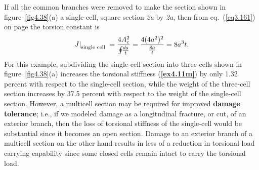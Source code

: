 \documentclass{AeroStructure-ERJohnson}
\begin{document}
\begin{example}
If all the common branches were removed to make the section shown in figure~\ref{fig4.38}(a) a single-cell, square section \textit{2a} by \textit{2a}, then from eq.~(\ref{eq3.161}) on page \pageref{eq3.161} the torsion constant is
\begin{align}\label{ex4.11q}
\left.J\right|_{\textrm{single cell }}=\frac{4 A_{c}^{2}}{\oint\hspace*{-3pt}\frac{d s}{t}}=\frac{4(4 a^{2})^{2}}{\frac{8 a}{t}}=8 a^{3} t.
\end{align}
For this example, subdividing the single-cell section into three cells shown in figure~\ref{fig4.38}(a) increases the torsional stiffness (\textbf{\ref{ex4.11m}}) by only 1.32 percent with respect to the single-cell section, while the weight of the three-cell section increases by 37.5 percent with respect to the weight of the single-cell section. However, a multicell section may be required for improved \textbf{damage tolerance}; i.e., if we modeled damage as a longitudinal fracture, or cut, of an exterior branch, then the loss of torsional stiffness of the single-cell would be substantial since it becomes an open section. Damage to an exterior branch of a multicell section on the other hand results in less of a reduction in torsional load carrying capability since some closed cells remain intact to carry the torsional load.
\end{example}

\vspace*{-2\baselineskip}
\end{document}
